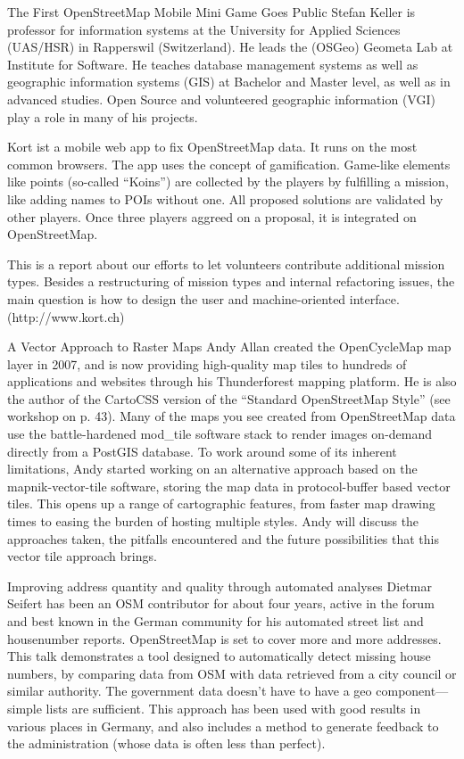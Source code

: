 %
{The First OpenStreetMap Mobile Mini Game Goes Public}%
{Stefan Keller is professor for information systems at the University for Applied Sciences (UAS/HSR) in Rapperswil (Switzerland). He leads the (OSGeo) Geometa Lab at Institute for Software. He teaches database management systems as well as geographic information systems (GIS) at Bachelor and Master level, as well as in advanced studies. Open Source and volunteered geographic information (VGI) play a role in many of his projects. }%
{Kort ist a mobile web app to fix OpenStreetMap data. It runs on the most common browsers. The app uses the concept of gamification. Game-like elements like points (so-called ``Koins'') are collected by the players by fulfilling a mission, like adding names to POIs without one. All proposed solutions are validated by other players. Once three players aggreed on a proposal, it is integrated on OpenStreetMap.

This is a report about our efforts to let volunteers contribute additional mission types. Besides a restructuring of mission types and internal refactoring issues, the main question is how to design the user and machine-oriented interface. (http://www.kort.ch)}


%
{A Vector Approach to Raster Maps}%
{Andy Allan created the OpenCycleMap map layer in 2007, and is now providing high-quality map tiles to hundreds of applications and websites through his Thunderforest mapping platform. He is also the author of the CartoCSS version of the ``Standard OpenStreetMap Style'' (see workshop on p. 43).}%
{Many of the maps you see created from OpenStreetMap data use the battle-hardened mod\_tile software stack to render images on-demand directly from a PostGIS database. To work around some of its inherent limitations, Andy started working on an alternative approach based on the mapnik-vector-tile software, storing the map data in protocol-buffer based vector tiles. This opens up a range of cartographic features, from faster map drawing times to easing the burden of hosting multiple styles. Andy will discuss the approaches taken, the pitfalls encountered and the future possibilities that this vector tile approach brings.}


%
{Improving address quantity and quality through automated analyses}%
{Dietmar Seifert has been an OSM contributor for about four years, active in the forum and best known in the German  community for his automated street list and housenumber reports.}%
{OpenStreetMap is set to cover more and more addresses. This talk demonstrates a tool designed to automatically detect missing house numbers, by comparing data from OSM with data retrieved from a city council or similar authority. The government data doesn't have to have a geo component---simple lists are sufficient. This approach has been used with good results in various places in Germany, and also includes a method to generate feedback to the administration (whose data is often less than perfect).}

